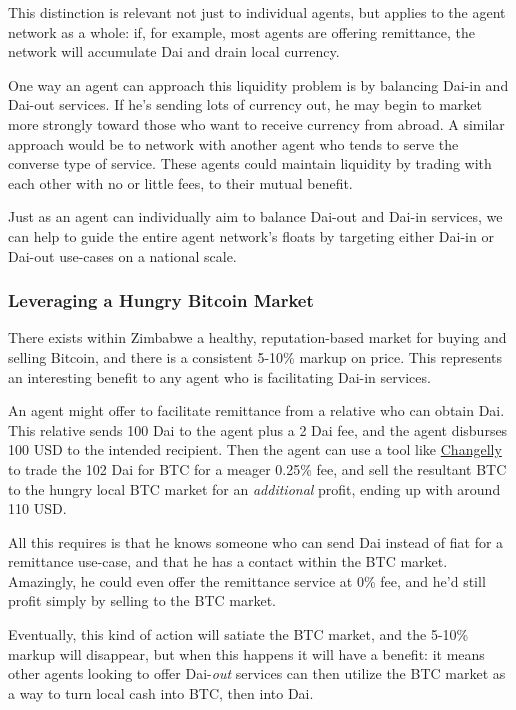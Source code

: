 \documentclass{article}
\begin{document}
This distinction is relevant not just to individual agents, but applies to the agent network as a whole: if, for example, most agents are offering remittance, the network will accumulate Dai and drain local currency.

One way an agent can approach this liquidity problem is by balancing Dai-in and Dai-out services. If he's sending lots of currency out, he may begin to market more strongly toward those who want to receive currency from abroad. A similar approach would be to network with another agent who tends to serve the converse type of service. These agents could maintain liquidity by trading with each other with no or little fees, to their mutual benefit.

Just as an agent can individually aim to balance Dai-out and Dai-in services, we can help to guide the entire agent network's floats by targeting either Dai-in or Dai-out use-cases on a national scale.

\subsubsection{Leveraging a Hungry Bitcoin Market} \label{bitcoin liquidity}

There exists within Zimbabwe a healthy, reputation-based market for buying and selling Bitcoin, and there is a consistent 5-10\% markup on price. This represents an interesting benefit to any agent who is facilitating Dai-in services.

An agent might offer to facilitate remittance from a relative who can obtain Dai. This relative sends 100 Dai to the agent plus a 2 Dai fee, and the agent disburses 100 USD to the intended recipient. Then the agent can use a tool like \href{https://changelly.com/}{Changelly} to trade the 102 Dai for BTC for a meager 0.25\% fee, and sell the resultant BTC to the hungry local BTC market for an \textit{additional} profit, ending up with around 110 USD.

All this requires is that he knows someone who can send Dai instead of fiat for a remittance use-case, and that he has a contact within the BTC market. Amazingly, he could even offer the remittance service at 0\% fee, and he'd still profit simply by selling to the BTC market.

Eventually, this kind of action will satiate the BTC market, and the 5-10\% markup will disappear, but when this happens it will have a benefit: it means other agents looking to offer Dai-\textit{out} services can then utilize the BTC market as a way to turn local cash into BTC, then into Dai.
\end{document}
